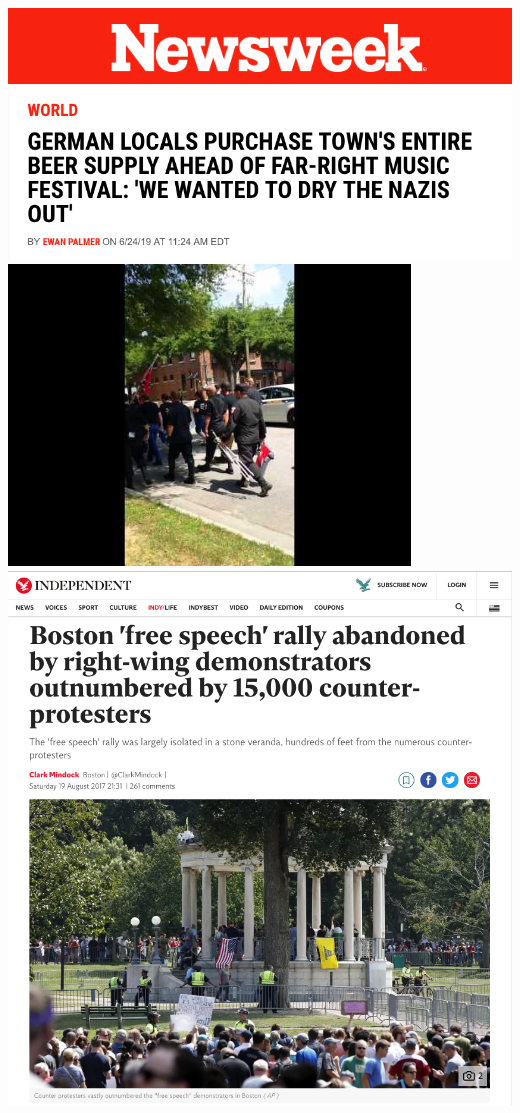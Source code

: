 \documentclass[nobackground,dvipsnames,table,aspectratio=169]{beamer}
\begin{document}
\begin{frame}{}
    \begin{columns}
            \centering
            \includegraphics[width=\textwidth]{newsweek}
            \includegraphics[width=\textwidth]{newsweek-article}
            \href{https://youtu.be/Rs4P1kKK-5k}{\includegraphics[width=0.8\textwidth]{kkk-marchers-video}}
            \includegraphics[width=\textwidth]{rally-abandoned-counterprotests}

\end{columns}
\end{frame}
\end{document}
